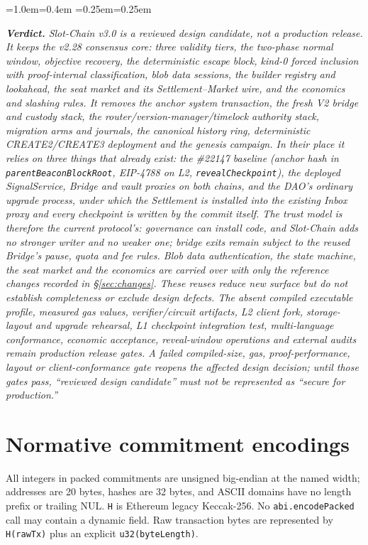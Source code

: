 \documentclass[a4paper,11pt]{article}
\newcommand{\code}[1]{\nolinkurl{#1}}
\newenvironment{designnote}
  {\par\smallskip\begin{list}{}{\leftmargin=1.0em\rightmargin=0.4em
      \parsep=0.25em\itemsep=0pt\topsep=0.25em}\item[]\small\itshape}
  {\end{list}\smallskip}
\begin{document}
\begin{designnote}
\textbf{Verdict.} Slot-Chain v3.0 is a reviewed design candidate, not a
production release.  It keeps the v2.28 consensus core: three validity tiers,
the two-phase normal window, objective recovery, the deterministic escape
block, kind-0 forced inclusion with proof-internal classification, blob data
sessions, the builder registry and lookahead, the seat market and its
Settlement--Market wire, and the economics and slashing rules.  It removes
the anchor system transaction, the fresh V2 bridge and custody stack, the
router/version-manager/timelock authority stack, migration arms and journals,
the canonical history ring, deterministic CREATE2/CREATE3 deployment and the
genesis campaign.  In their place it relies on three things that already
exist: the \#22147 baseline (anchor hash in \code{parentBeaconBlockRoot},
EIP-4788 on L2, \code{revealCheckpoint}), the deployed SignalService, Bridge
and vault proxies on both chains, and the DAO's ordinary upgrade process,
under which the Settlement is installed into the existing Inbox proxy and
every checkpoint is written by the commit itself.  The trust model is
therefore the current protocol's: governance can install code, and
Slot-Chain adds no stronger writer and no weaker one; bridge exits remain
subject to the reused Bridge's pause, quota and fee rules.  Blob data
authentication, the state machine, the seat market and the economics are
carried over with only the reference changes recorded in
\S\ref{sec:changes}.  These reuses reduce new surface but do not establish
completeness or exclude design defects.  The absent compiled executable
profile, measured gas values, verifier/circuit artifacts, L2 client fork,
storage-layout and upgrade rehearsal, L1 checkpoint integration test,
multi-language conformance, economic acceptance, reveal-window operations and
external audits remain production release gates.  A failed compiled-size,
gas, proof-performance, layout or client-conformance gate reopens the
affected design decision; until those gates pass, ``reviewed design
candidate'' must not be represented as ``secure for production.''
\end{designnote}

\clearpage
\appendix
\section{Normative commitment encodings}\label{sec:encodings}

All integers in packed commitments are unsigned big-endian at the named width;
addresses are 20 bytes, hashes are 32 bytes, and ASCII domains have no length
prefix or trailing NUL.  \code{H} is Ethereum legacy Keccak-256.  No
\code{abi.encodePacked} call may contain a dynamic field.  Raw transaction bytes
are represented by \code{H(rawTx)} plus an explicit \code{u32(byteLength)}.
\end{document}
